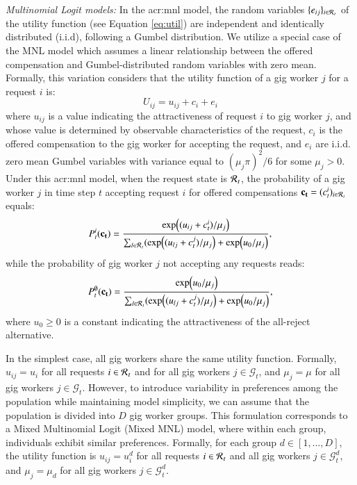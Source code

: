 \noindent\textit{Multinomial Logit models:} In the \gls{acr:mnl} model, the random variables $\{e_{ij}\}_{i \in \mathcal{R}\hspace{0.05em}_{t}}$ of the utility function (see Equation \ref{eq:util}) are independent and identically distributed (i.i.d), following a Gumbel distribution. We utilize a special case of the MNL model which assumes a linear relationship between the offered compensation and Gumbel-distributed random variables with zero mean. Formally, this variation considers that the utility function of a gig worker $j$ for a request $i$ is:
\begin{equation} U_{ij} = u_{ij} + c_{i} + e_i \end{equation} where $u_{ij}$ is a value indicating the attractiveness of request $i$ to gig worker $j$, and whose value is determined by observable characteristics of the request, $c_i$ is the offered compensation to the gig worker for accepting the request, and $e_i$ are i.i.d. zero mean Gumbel variables with variance equal to $(\mu_j\pi)^2/6$ for some $\mu_j> 0$. Under this \gls{acr:mnl} model, when the request state is $\mathcal{R}\hspace{0.05em}_{t}$, the probability of a gig worker $j$ in time step $t$ accepting request $i$ for offered compensations $\mathbf{c_t} = (c^i_t)_{i \in \mathcal{R}\hspace{0.05em}_{t}}$ equals:
\begin{align} P^i_{t}(\mathbf{c_t}) = \frac{\exp((u_{ij} + c_t^i)/\mu_j)}{\sum_{l \in \mathcal{R}\hspace{0.05em}_{t}}(\exp((u_{lj} + c_t^j)/\mu_j) + \exp(u_0/\mu_j)},\label{eq:mnl1}\end{align} 
while the probability of gig worker $j$ not accepting any requests reads:
\begin{align} P^\emptyset_{t}(\mathbf{c_t}) = \frac{ \exp(u_0/\mu_j)}{\sum_{l \in \mathcal{R}\hspace{0.05em}_{t}}(\exp((u_{lj} + c_t^j)/\mu_j) + \exp(u_0/\mu_j)},\label{eq:mnl2}\end{align} 
where $u_0 \geq 0$ is a constant indicating the attractiveness of the all-reject alternative. 

In the simplest case, all gig workers share the same utility function. Formally, $u_{ij} = u_i$ for all requests $i \in \mathcal{R}\hspace{0.05em}_{t}$ and for all gig workers $j \in \mathcal{G}_t$, and $\mu_j = \mu$ for all gig workers $j \in \mathcal{G}_t$. However, to introduce variability in preferences among the population while maintaining model simplicity, we can assume that the population is divided into $D$ gig worker groups. This formulation corresponds to a Mixed Multinomial Logit (Mixed MNL) model, where within each group, individuals exhibit similar preferences. Formally, for each group $d \in [1,\dots,D]$, the utility function is $u_{ij} = u_i^d$  for all requests $i \in \mathcal{R}\hspace{0.05em}_{t}$ and all gig workers $j \in \mathcal{G}^d_t$, and $\mu_j = \mu_d$ for all gig workers $j \in \mathcal{G}^d_t$.


